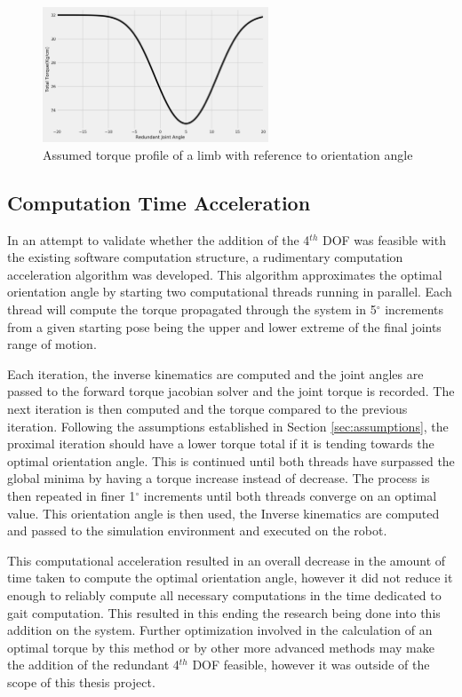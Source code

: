 \documentclass[12pt]{report}
\begin{document}
\begin{figure}[H]
    \centering
    \includegraphics[width=0.6\textwidth]{Images/torqueCurve.png}
    \caption{Assumed torque profile of a limb with reference to orientation angle}
    \label{fig:AssumedTorque}
\end{figure}
\subsection{Computation Time Acceleration}
In an attempt to validate whether the addition of the 4$^{th}$ DOF was feasible with the existing software computation structure, a rudimentary computation acceleration algorithm was developed. This algorithm approximates the optimal orientation angle by starting two computational threads running in parallel. Each thread will compute the torque propagated through the system in 5$^{\circ}$ increments from a given starting pose being the upper and lower extreme of the final joints range of motion. 

Each iteration, the inverse kinematics are computed and the joint angles are passed to the forward torque jacobian solver and the joint torque is recorded. The next iteration is then computed and the torque compared to the previous iteration. Following the assumptions established in Section \ref{sec:assumptions}, the proximal iteration should have a lower torque total if it is tending towards the optimal orientation angle. This is continued until both threads have surpassed the global minima by having a torque increase instead of decrease. The process is then repeated in finer 1$^{\circ}$ increments until both threads converge on an optimal value. This orientation angle is then used, the Inverse kinematics are computed and passed to the simulation environment and executed on the robot. 

This computational acceleration resulted in an overall decrease in the amount of time taken to compute the optimal orientation angle, however it did not reduce it enough to reliably compute all necessary computations in the time dedicated to gait computation. This resulted in this ending the research being done into this addition on the system. Further optimization involved in the calculation of an optimal torque by this method or by other more advanced methods may make the addition of the redundant 4$^{th}$ DOF feasible, however it was outside of the scope of this thesis project. 
\end{document}
